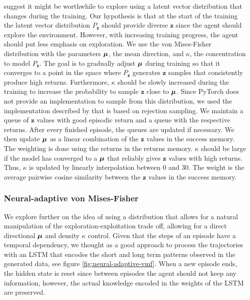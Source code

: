 \documentclass[10pt]{article} %
\begin{document}
\cite{rle-paper} suggest it might be worthwhile to explore using a latent vector distribution that changes during the training. Our hypothesis is that at the start of the training the latent vector distribution $P_{\textbf{z}}$ should provide diverse $\textbf{z}$ since the agent should explore the environment. However, with increasing training progress, the agent should put less emphasis on exploration. We use the von Mises-Fisher distribution with the parameters ${\bm{\mu}}$, the mean direction, and $\kappa$, the concentration to model $P_{\textbf{z}}$. The goal is to gradually adjust ${\bm{\mu}}$ during training so that it converges to a point in the space where $P_{\textbf{z}}$ generates $\mathbf{z}$ samples that consistently produce high returns. Furthermore, $\kappa$ should be slowly increased during the training to increase the probability to sample $\mathbf{z}$ close to ${\bm{\mu}}$. Since PyTorch does not provide an implementation to sample from this distribution, we used the implementation described by \cite{von-mises-fisher-paper} that is based on rejection sampling. We maintain a queue of $\textbf{z}$ values with good episodic return and a queue with the respective returns. After every finished episode, the queues are updated if necessary. We then update ${\bm{\mu}}$ as a linear combination of the $\textbf{z}$ values in the success memory. The weighting is done using the returns in the returns memory. $\kappa$ should be large if the model has converged to a ${\bm{\mu}}$ that reliably gives $\textbf{z}$ values with high returns. Thus, $\kappa$ is updated by linearly interpolation between $0$ and $30$. The weight is the average pairwise cosine similarity between the $\textbf{z}$ values in the success memory.

\vspace{-1pt}
\subsubsection{Neural-adaptive von Mises-Fisher}

We explore further on the idea of using a distribution that allows for a natural manipulation of the exploration-exploitation trade off, allowing for a direct directional ${\bm{\mu}}$ and density $\kappa$ control. Given that the steps of an episode have a temporal dependency, we thought as a good approach to process the trajectories with an LSTM that encodes the short and long term patterns observed in the generated data, see figure \ref{fig:neural-adaptive-vmf}. When a new episode ends, the hidden state is reset since between episodes the agent should not keep any information, however, the actual knowledge encoded in the weights of the LSTM are preserved. 
\end{document}

